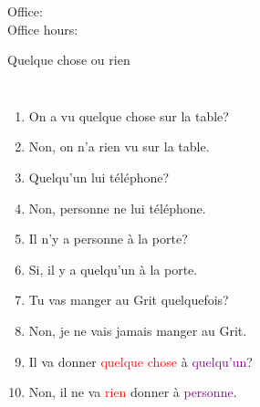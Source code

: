 \documentclass{beamer}
\subtitle[Indéfinies et négatives]{Les expressions indéfinies et négatives}
\begin{document}
  \begin{frame}
    \titlepage
    \tiny{Office: \\
          Office hours: }
  \end{frame}

  \begin{frame}{Quelque chose ou rien}
    \scriptsize
    \begin{columns}
        \begin{enumerate}
          \item On a vu \alert{quelque chose} sur la table?
          \item<2->[$\to$] Non, on n'a \alert{rien} vu sur la table.
          \item<3-> \alert{Quelqu'un} lui téléphone?
          \item<4->[$\to$] Non, \alert{personne ne} lui téléphone.
          \item<5-> Il n'y a \alert{personne} à la porte?
          \item<6->[$\to$] Si, il y a \alert{quelqu'un} à la porte.
          \item<7-> Tu vas manger au Grit \alert{quelquefois}?
          \item<8->[$\to$] Non, je ne vais \alert{jamais} manger au Grit.
          \item<9-> Il va donner \textcolor{red}{quelque chose} à \textcolor{purple}{quelqu'un}?
          \item<10->[$\to$] Non, il ne va \textcolor{red}{rien} donner à \textcolor{purple}{personne}.
        \end{enumerate}
        \begin{minipage}[c][0.8\textheight]{\linewidth}
          \begin{center}
          \end{center}
        \end{minipage}
    \end{columns}
  \end{frame}
\end{document}
